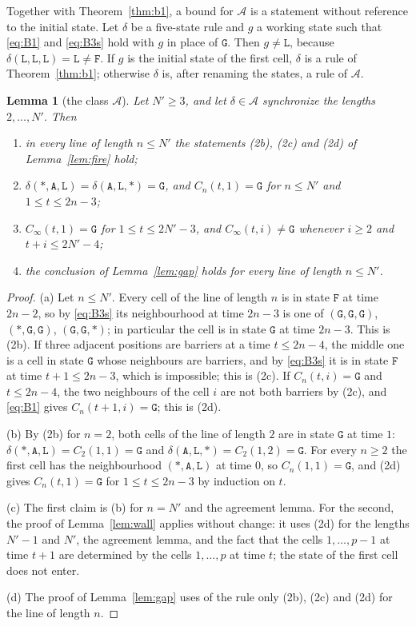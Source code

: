 \documentclass[11pt]{article}
\newtheorem{lemma}{Lemma}
\theoremstyle{remark}
\newcommand{\Lq}{\mathtt{L}}\newcommand{\Gq}{\mathtt{G}}\newcommand{\Aq}{\mathtt{A}}\newcommand{\Bq}{\mathtt{B}}\newcommand{\Fq}{\mathtt{F}}
\begin{document}
Together with Theorem~\ref{thm:b1}, a bound for $\mathcal A$ is a statement without reference to the initial
state. Let $\delta$ be a five-state rule and $g$ a working state such that \eqref{eq:B1} and \eqref{eq:B3s} hold
with $g$ in place of $\Gq$. Then $g\ne\Lq$, because $\delta(\Lq,\Lq,\Lq)=\Lq\ne\Fq$. If $g$ is the initial
state of the first cell, $\delta$ is a rule of Theorem~\ref{thm:b1}; otherwise $\delta$ is, after renaming the
states, a rule of $\mathcal A$.

\begin{lemma}[the class $\mathcal A$]\label{lem:classA}
Let $N'\ge3$, and let $\delta\in\mathcal A$ synchronize the lengths $2,\dots,N'$. Then
\begin{enumerate}[label=\textup{(\alph*)},nosep]
\item in every line of length $n\le N'$ the statements \textup{(2b)}, \textup{(2c)} and \textup{(2d)} of
Lemma~\ref{lem:fire} hold;
\item $\delta(\ast,\Aq,\Lq)=\delta(\Aq,\Lq,\ast)=\Gq$, and $C_n(t,1)=\Gq$ for $n\le N'$ and $1\le t\le 2n-3$;
\item $C_\infty(t,1)=\Gq$ for $1\le t\le 2N'-3$, and $C_\infty(t,i)\ne\Gq$ whenever $i\ge2$ and $t+i\le 2N'-4$;
\item the conclusion of Lemma~\ref{lem:gap} holds for every line of length $n\le N'$.
\end{enumerate}
\end{lemma}

\begin{proof}
(a) Let $n\le N'$. Every cell of the line of length $n$ is in state $\Fq$ at time $2n-2$, so by \eqref{eq:B3s}
its neighbourhood at time $2n-3$ is one of $(\Gq,\Gq,\Gq)$, $(\ast,\Gq,\Gq)$, $(\Gq,\Gq,\ast)$; in particular
the cell is in state $\Gq$ at time $2n-3$. This is (2b). If three adjacent positions are barriers at a time
$t\le 2n-4$, the middle one is a cell in state $\Gq$ whose neighbours are barriers, and by \eqref{eq:B3s} it is
in state $\Fq$ at time $t+1\le 2n-3$, which is impossible; this is (2c). If $C_n(t,i)=\Gq$ and $t\le 2n-4$, the
two neighbours of the cell $i$ are not both barriers by (2c), and \eqref{eq:B1} gives $C_n(t+1,i)=\Gq$; this is
(2d).

(b) By (2b) for $n=2$, both cells of the line of length $2$ are in state $\Gq$ at time $1$:
$\delta(\ast,\Aq,\Lq)=C_2(1,1)=\Gq$ and $\delta(\Aq,\Lq,\ast)=C_2(1,2)=\Gq$. For every $n\ge2$ the first cell has
the neighbourhood $(\ast,\Aq,\Lq)$ at time $0$, so $C_n(1,1)=\Gq$, and (2d) gives $C_n(t,1)=\Gq$ for
$1\le t\le 2n-3$ by induction on $t$.

(c) The first claim is (b) for $n=N'$ and the agreement lemma. For the second, the proof of
Lemma~\ref{lem:wall} applies without change: it uses (2d) for the lengths $N'-1$ and $N'$, the agreement
lemma, and the fact that the cells $1,\dots,p-1$ at time $t+1$ are determined by the cells $1,\dots,p$ at time
$t$; the state of the first cell does not enter.

(d) The proof of Lemma~\ref{lem:gap} uses of the rule only (2b), (2c) and (2d) for the line of length $n$.
\end{proof}
\end{document}
